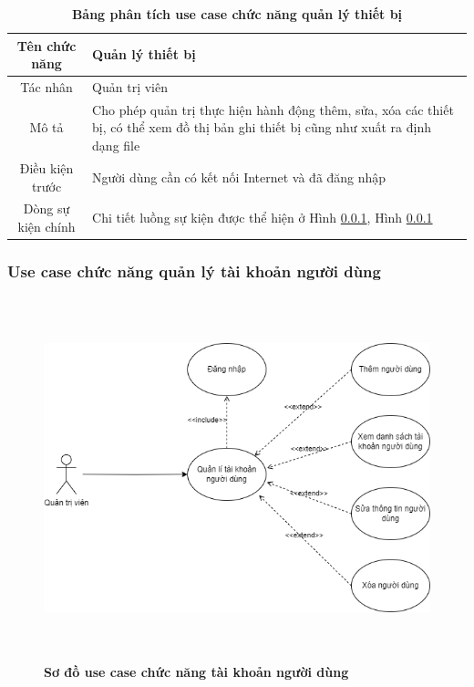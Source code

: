   \begin{table}[H]
    \caption{\bfseries \fontsize{12pt}{0pt}\selectfont Bảng phân tích use case chức năng quản lý thiết bị}
    \centering
    \begin{tabularx}{0.9\textwidth}{|c|X|}
      \hline
      \textbf{Tên chức năng} & \textbf{Quản lý thiết bị} \\
      \hline
      Tác nhân & Quản trị viên \\
      \hline
      Mô tả & Cho phép quản trị thực hiện hành động thêm, sửa, xóa các thiết bị, có thể xem đồ thị bản ghi thiết bị cũng như
      xuất ra định dạng file \\
      \hline
      Điều kiện trước & Người dùng cần có kết nối Internet và đã đăng nhập \\
      \hline
      Dòng sự kiện chính & 
        Chi tiết luồng sự kiện được thể hiện ở Hình \ref{}, Hình \ref{} 
        \\
      \hline
    \end{tabularx}
  \end{table}

\subsubsection{Use case chức năng quản lý tài khoản người dùng}
  \begin{figure}[H]
    \centering
    \includegraphics[width=15cm,height=10.5cm]{Images/use_case/use_case_manage_users.png}
    \caption[Sơ đồ use case chức năng tài khoản người dùng]{\bfseries \fontsize{12pt}{0pt}
    \selectfont Sơ đồ use case chức năng tài khoản người dùng}
    \label{use_case_user_management} %
  \end{figure}

